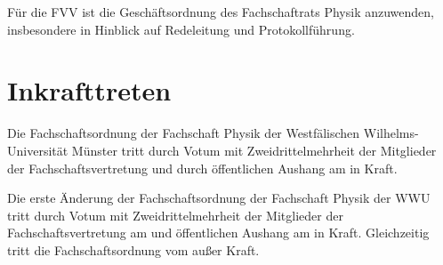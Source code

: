 Für die FVV ist die Geschäftsordnung des Fachschaftrats Physik anzuwenden, insbesondere in Hinblick auf Redeleitung und Protokollführung.

\section{Inkrafttreten}
Die Fachschaftsordnung der Fachschaft Physik der Westfälischen Wilhelms-Universität Münster tritt durch Votum mit Zweidrittelmehrheit der Mitglieder der Fachschaftsvertretung und durch öffentlichen Aushang am  in Kraft.

Die erste Änderung der Fachschaftsordnung der Fachschaft Physik der WWU tritt durch Votum mit Zweidrittelmehrheit der Mitglieder der Fachschaftsvertretung am  und öffentlichen Aushang am  in Kraft. Gleichzeitig tritt die Fachschaftsordnung vom  außer Kraft.


